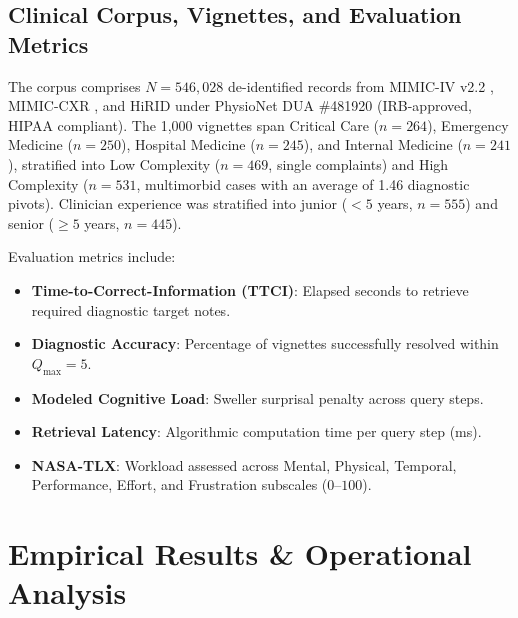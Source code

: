 \documentclass[10pt, onecolumn]{article}
\begin{document}
\subsection{Clinical Corpus, Vignettes, and Evaluation Metrics}
The corpus comprises $N = 546{,}028$ de-identified records from MIMIC-IV v2.2 \cite{johnson2023mimic}, MIMIC-CXR \cite{johnson2019mimiccxr}, and HiRID \cite{hyland2020hirid} under PhysioNet DUA \#481920 (IRB-approved, HIPAA compliant). The 1{,}000 vignettes span Critical Care ($n=264$), Emergency Medicine ($n=250$), Hospital Medicine ($n=245$), and Internal Medicine ($n=241$), stratified into Low Complexity ($n=469$, single complaints) and High Complexity ($n=531$, multimorbid cases with an average of 1.46 diagnostic pivots). Clinician experience was stratified into junior ($<5$ years, $n=555$) and senior ($\ge 5$ years, $n=445$).

Evaluation metrics include:
\begin{itemize}
  \item \textbf{Time-to-Correct-Information (TTCI)}: Elapsed seconds to retrieve required diagnostic target notes.
  \item \textbf{Diagnostic Accuracy}: Percentage of vignettes successfully resolved within $Q_{\max} = 5$.
  \item \textbf{Modeled Cognitive Load}: Sweller surprisal penalty across query steps.
  \item \textbf{Retrieval Latency}: Algorithmic computation time per query step (ms).
  \item \textbf{NASA-TLX}: Workload assessed across Mental, Physical, Temporal, Performance, Effort, and Frustration subscales ($0$--$100$).
\end{itemize}

\section{Empirical Results \& Operational Analysis}
\label{sec:results}
\end{document}
